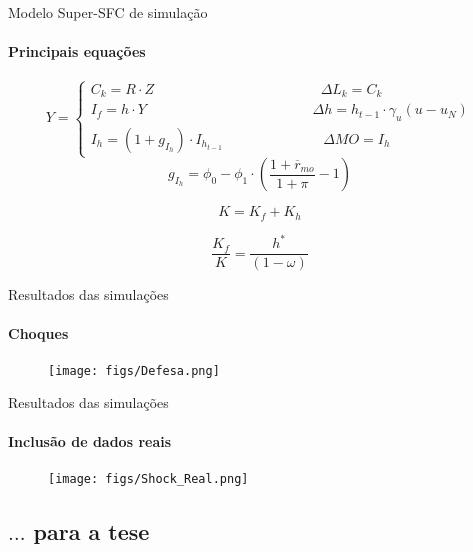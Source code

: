 \begin{frame}{Modelo Super-SFC de simulação}
\framesubtitle{Principais equações}

$$
Y = 
\begin{cases}
C_k = R \cdot Z \hspace{5cm} \Delta L_k = C_k\\
I_f = h\cdot Y \hspace{5cm} \Delta h = h_{t-1}\cdot\gamma_u (u-u_N)\\
I_h =  (1+g_{I_h})\cdot I_{h_{t-1}} \hspace{3cm} \Delta MO = I_h
\end{cases}
$$
$$
g_{I_h} = \phi_0 - \phi_1\cdot \left(\frac{1+\overline r_{mo}}{1+\pi} - 1\right)
$$

$$
K = K_f + K_h
$$

$$
\frac{K_f}{K} = \frac{h^*}{(1 - \omega)}
$$
    
\end{frame}

\begin{frame}{Resultados das simulações}
\framesubtitle{Choques}

\begin{figure}
    \centering
    \texttt{[image: figs/Defesa.png]}
\end{figure}
    
\end{frame}

\begin{frame}{Resultados das simulações}
\framesubtitle{Inclusão de dados reais}

\begin{figure}
    \centering
    \texttt{[image: figs/Shock\_Real.png]}
\end{figure}
    
\end{frame}


\subsection{$\ldots$ para a tese}

